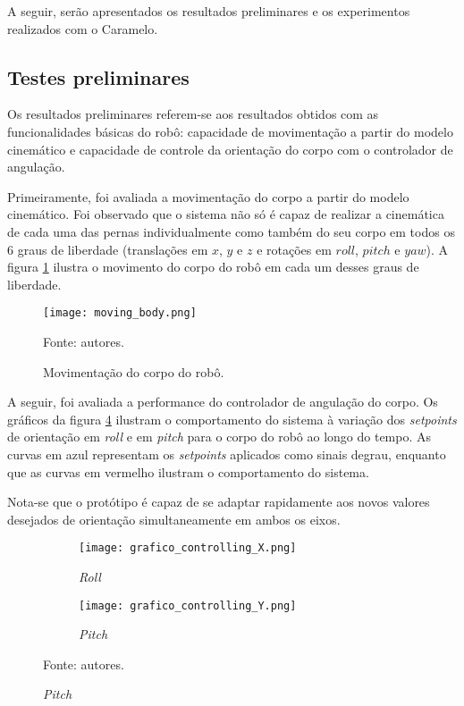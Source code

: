 \documentclass[../main.tex]{subfiles}
\begin{document}
  A seguir, serão apresentados os resultados preliminares e os experimentos realizados com o Caramelo. 
  
  \subsection{Testes preliminares}
  
  Os resultados preliminares referem-se aos resultados obtidos com as funcionalidades básicas do robô: capacidade de movimentação a partir do modelo cinemático e capacidade de controle da orientação do corpo com o controlador de angulação.

  Primeiramente, foi avaliada a movimentação do corpo a partir do modelo cinemático. Foi observado que o sistema não só é capaz de realizar a cinemática de cada uma das pernas individualmente como também do seu corpo em todos os 6 graus de liberdade (translações em $x$, $y$ e $z$ e rotações em $roll$, $pitch$ e $yaw$). A figura \ref{fig:moving_body} ilustra o movimento do corpo do robô em cada um desses graus de liberdade.

  \begin{figure}[!htb]
    \centering
    \caption{Movimentação do corpo do robô.}
    \texttt{[image: moving\_body.png]}
    
    Fonte: autores.
    \label{fig:moving_body}
  \end{figure}

  A seguir, foi avaliada a performance do controlador de angulação do corpo. Os gráficos da figura \ref{fig:grafico_controlling} ilustram o comportamento do sistema à variação dos \textit{setpoints} de orientação em \textit{roll} e em \textit{pitch} para o corpo do robô ao longo do tempo. As curvas em azul representam os \textit{setpoints} aplicados como sinais degrau, enquanto que as curvas em vermelho ilustram o comportamento do sistema.
  
  Nota-se que o protótipo é capaz de se adaptar rapidamente aos novos valores desejados de orientação simultaneamente em ambos os eixos.

  \begin{figure}[!htb]
    \centering
    \caption{Respostas dos controles de angulação}
    \begin{subfigure}[t]{0.48\textwidth}
      \centering
      \texttt{[image: grafico\_controlling\_X.png]}
      \caption{\textit{Roll}}
      \label{fig:controlling_roll}
    \end{subfigure}
    \begin{subfigure}[t]{0.48\textwidth}
      \centering
      \texttt{[image: grafico\_controlling\_Y.png]}
      \caption{\textit{Pitch}}
      \label{fig:controlling_pitch}
    \end{subfigure}
    
    Fonte: autores.
    \label{fig:grafico_controlling}
  \end{figure}
\end{document}
